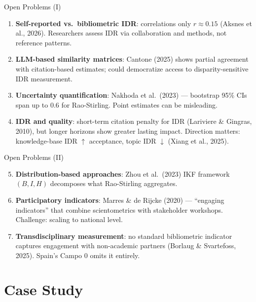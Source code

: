 \documentclass[aspectratio=169,10pt]{beamer}
\begin{document}
\begin{frame}{Open Problems (I)}
\begin{enumerate}
  \item \textbf{Self-reported vs.\ bibliometric IDR}: correlations
        only $r \approx 0.15$ (Aksnes et al., 2026). Researchers assess IDR
        via collaboration and methods, not reference patterns.
  \item \textbf{LLM-based similarity matrices}: Cantone (2025) shows
        partial agreement with citation-based estimates; could
        democratize access to disparity-sensitive IDR measurement.
  \item \textbf{Uncertainty quantification}: Nakhoda et al.\ (2023)
        --- bootstrap 95\% CIs span up to 0.6 for Rao-Stirling.
        Point estimates can be misleading.
  \item \textbf{IDR and quality}: short-term citation penalty for IDR
        (Lariviere \& Gingras, 2010), but longer horizons show greater
        lasting impact. Direction matters: knowledge-base IDR $\uparrow$
        acceptance, topic IDR $\downarrow$ (Xiang et al., 2025).
\end{enumerate}
\end{frame}

\begin{frame}{Open Problems (II)}
\begin{enumerate}\setcounter{enumi}{4}
  \item \textbf{Distribution-based approaches}: Zhou et al.\ (2023)
        IKF framework $(B, I, H)$ decomposes what Rao-Stirling aggregates.
  \item \textbf{Participatory indicators}: Marres \& de Rijcke (2020)
        --- ``engaging indicators'' that combine scientometrics with
        stakeholder workshops. Challenge: scaling to national level.
  \item \textbf{Transdisciplinary measurement}: no standard bibliometric
        indicator captures engagement with non-academic partners
        (Borlaug \& Svartefoss, 2025). Spain's Campo 0 omits it entirely.
\end{enumerate}
\end{frame}

\section{Case Study}
\end{document}
